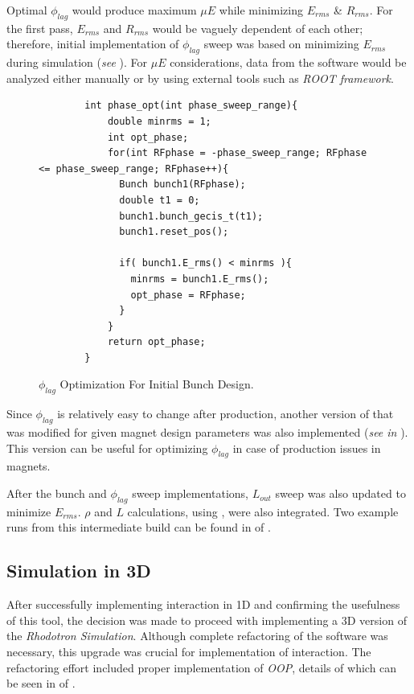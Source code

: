 \documentclass[a4paper,oneside,12pt]{report}
\numberwithin{equation}{chapter}
\begin{document}
Optimal $\phi_{lag}$ would produce maximum $\mu E$ while minimizing $E_{rms}$ \& $R_{rms}$. For the first pass, 
$E_{rms}$ and $R_{rms}$ would be vaguely dependent of each other; therefore, initial implementation of $\phi_{lag}$ sweep was based on minimizing $E_{rms}$ during simulation (\textit{see }). 
For $\mu E$ considerations, data from the software would be analyzed either manually or by using external tools such as \textit{ROOT framework}. 
\vspace{20pt}
\begin{figure}[H]
    \centering
    \begin{verbatim}
        int phase_opt(int phase_sweep_range){
            double minrms = 1;
            int opt_phase;
            for(int RFphase = -phase_sweep_range; RFphase <= phase_sweep_range; RFphase++){
              Bunch bunch1(RFphase);
              double t1 = 0;
              bunch1.bunch_gecis_t(t1);
              bunch1.reset_pos();
        
              if( bunch1.E_rms() < minrms ){
                minrms = bunch1.E_rms();
                opt_phase = RFphase;
              }
            }
            return opt_phase;
        }
    \end{verbatim}
    \vspace{20pt}
    \caption{$\phi_{lag}$ Optimization For Initial Bunch Design.}
    \label{fig:phlag_opt}
\end{figure}
\clearpage
Since $\phi_{lag}$ is relatively easy to change after production, another version of  that was modified for given magnet design parameters was also implemented (\textit{see  in }). 
This version can be useful for optimizing $\phi_{lag}$ in case of production issues in magnets. 

After the bunch and $\phi_{lag}$ sweep implementations, $L_{out}$ sweep was also updated to minimize $E_{rms}$. $\rho$ and $L$ calculations, using , were also integrated. 
Two example runs from this intermediate build can be found in  of .

\subsection{Simulation in 3D}
After successfully implementing \eE interaction in 1D and confirming the usefulness of this tool, the decision was made to proceed with implementing a 3D version of the \textit{Rhodotron Simulation}.
Although complete refactoring of the software was necessary, this upgrade was crucial for implementation of \eB interaction.
The refactoring effort included proper implementation of \textit{OOP}, details of which can be seen in  of .
\end{document}
